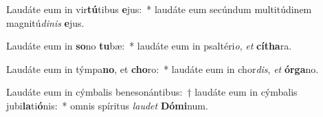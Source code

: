 \item Laudáte eum in vir\textbf{tú}tibus \textbf{e}jus:~* laudáte eum secúndum multitúdinem magnitú\textit{di}\textit{nis} \textbf{e}jus.
\item Laudáte eum in \textbf{so}no \textbf{tu}bæ:~* laudáte eum in psaltéri\textit{o}, \textit{et} \textbf{cí}\textbf{tha}ra.
\item Laudáte eum in týmpa\textbf{no}, et \textbf{cho}ro:~* laudáte eum in chor\textit{dis}, \textit{et} \textbf{ór}\textbf{ga}no.
\item Laudáte eum in cýmbalis benesonántibus:~† laudáte eum in cýmbalis jubi\textbf{la}ti\textbf{ó}nis:~* omnis spíritus \textit{lau}\textit{det} \textbf{Dó}\textbf{mi}num.
